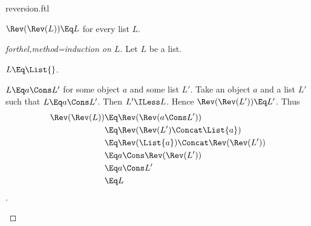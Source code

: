 \documentclass{stex}
\begin{document}
\begin{smodule}{reversion.ftl}
\begin{proposition*}[forthel]
  $\Rev(\Rev(L)) \Eq L$ for every list $L$.
\end{proposition*}
\begin{proof}[forthel,method=induction on $L$]
  Let $L$ be a list.

  \begin{case}{$L \Eq \List{}$.}\end{case}

  \begin{case}{$L \Eq a \Cons L'$ for some object $a$ and some list $L'$.}
    Take an object $a$ and a list $L'$ such that $L \Eq a \Cons L'$.
    Then $L' \ILess L$.
    Hence $\Rev(\Rev(L')) \Eq L'$.
    Thus
    \begin{align*}
      \Rev(\Rev(L))
        &\Eq \Rev(\Rev(a \Cons L'))\\
        &\Eq \Rev(\Rev(L') \Concat \List{a})\\
        &\Eq \Rev(\List{a}) \Concat \Rev(\Rev(L'))\\
        &\Eq a \Cons \Rev(\Rev(L'))\\
        &\Eq a \Cons L'\\
        &\Eq L
    \end{align*}.
  \end{case}
\end{proof}

\end{smodule}
\end{document}
